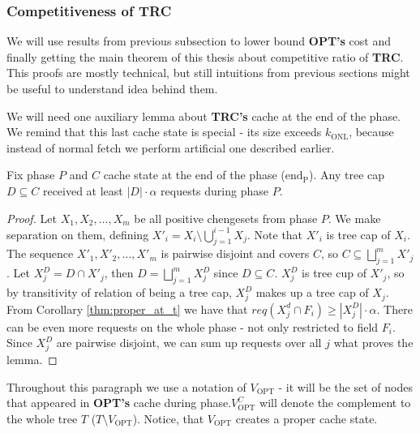 \subsubsection{Competitiveness of TRC}
We will use results from previous subsection to lower bound \textbf{OPT's} cost 
and finally getting the main theorem of this thesis about competitive ratio of 
\textbf{TRC}. This proofs are mostly technical, but still intuitions from 
previous sections might be useful to understand idea behind them.

We will need one auxiliary lemma about \textbf{TRC's} cache at the end of the 
phase. We remind that this last cache state is special - its size exceeds 
$k_{\mathrm{ONL}}$, because instead of normal fetch we perform artificial one 
described earlier.  
\begin{lemma}
Fix phase $P$ and $C$ cache state at the end of the phase ($\mathrm{end_P}$). 
Any tree 
cap $D \subseteq C$ received at least $|D| \cdot \alpha$ requests during phase 
$P$.
\label{thm:lots_of_req_in_tc_end_of_p}
\end{lemma}
\begin{proof}
Let $X_1, X_2, \ldots, X_m$ be all positive chengesets from phase $P$. We make 
separation on them, defining $X'_i = X_i \setminus \bigcup_{j=1}^{i-1} X_j$. 
Note 
that $X'_i$ is tree cap of $X_i$. The sequence $X'_1, X'_2, \ldots, X'_m$ is 
pairwise disjoint and covers $C$, so $C \subseteq \bigsqcup_{j=1}^m 
X'_j$. Let $X_j^D = D \cap X'_j$, then $D = \bigsqcup_{j=1}^m X_j^D$ since $D 
\subseteq C$. $X_j^D$ is tree cup of $X'_j$, so by transitivity of relation of
being a tree cap, $X_j^D$ makes up a tree cap of $X_j$. From Corollary 
\ref{thm:proper_at_t} we have that $req(X_j^d \cap F_i) \geq |X_j^D| \cdot 
\alpha$. There can be even more requests on the whole phase - not only 
restricted to 
field $F_i$. Since $X_j^D$ are pairwise disjoint, we can sum up requests over 
all $j$ what proves the lemma.
\end{proof}

Throughout this paragraph we use a notation of $V_{\mathrm{OPT}}$ - it will be 
the set of nodes 
that appeared in \textbf{OPT's} cache during phase.$V_{\mathrm{OPT}}^C$ will 
denote the complement to the whole tree $T$ ($T \setminus V_{\mathrm{OPT}}$). 
Notice, 
that $V_{\mathrm{OPT}}$ creates a proper cache state.

